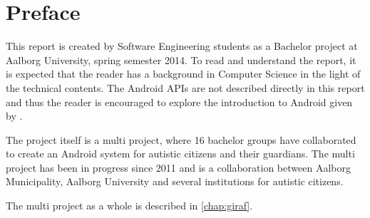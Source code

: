 \newcommand{\headerPreface}{Preface}
\cleardoublepage
{}
\pdfbookmark{\headerPreface}{chap:preface}
\chapter*{\headerPreface}\label{chap:preface}













This report is created by Software Engineering students as a Bachelor project at Aalborg University, spring semester 2014.
To read and understand the report, it is expected that the reader has a background in Computer Science in the light of the technical contents.
The Android APIs are not described directly in this report and thus the reader is encouraged to explore the introduction to Android given by \citet{androidIntroduction}.

The project itself is a multi project, where 16 bachelor groups have collaborated to create an Android system for autistic citizens and their guardians.
The multi project has been in progress since 2011 and is a collaboration between Aalborg Municipality, Aalborg University and several institutions for autistic citizens.

The multi project as a whole is described in \cref{chap:giraf}.\\

